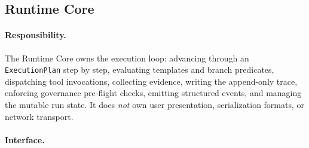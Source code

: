\subsection{Runtime Core}

\paragraph{Responsibility.}
The Runtime Core owns the execution loop: advancing through an \texttt{ExecutionPlan} step by step,
evaluating templates and branch predicates, dispatching tool invocations, collecting evidence, writing
the append-only trace, enforcing governance pre-flight checks, emitting structured events, and
managing the mutable run state. It does \emph{not} own user presentation, serialization formats, or
network transport.

\paragraph{Interface.}

